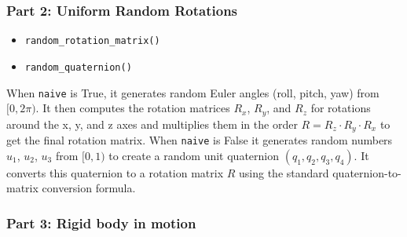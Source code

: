 \documentclass{article}
\begin{document}
\subsubsection*{Part 2: Uniform Random Rotations}

\begin{itemize}
    \item \texttt{random\_rotation\_matrix()}
    \item \texttt{random\_quaternion()}
\end{itemize}

When \texttt{naive} is True, it generates random Euler angles (roll, pitch, yaw) from \([0, 2\pi)\). It then computes the rotation matrices \(R_x\), \(R_y\), and \(R_z\) for rotations around the x, y, and z axes and multiplies them in the order \(R = R_z \cdot R_y \cdot R_x\) to get the final rotation matrix. When \texttt{naive} is False it generates random numbers \(u_1\), \(u_2\), \(u_3\) from \([0, 1)\) to create a random unit quaternion \((q_1, q_2, q_3, q_4)\). It converts this quaternion to a rotation matrix \(R\) using the standard quaternion-to-matrix conversion formula.

\subsubsection*{Part 3: Rigid body in motion}
\end{document}
